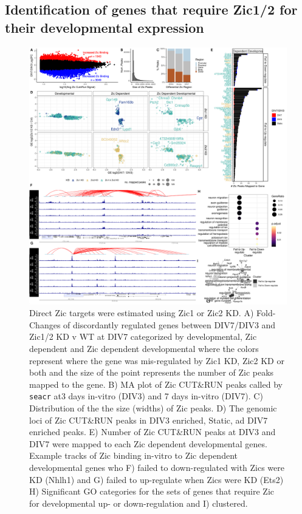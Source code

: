 \documentclass[fleqn,10pt]{wlscirep}
\begin{document}
\subsection*{Identification of genes that require Zic1/2 for their developmental expression}
\begin{figure}[!ht]
\includegraphics[width=.95\textwidth]{../figures/figure4.png}
\caption{Direct Zic targets were estimated using Zic1 or Zic2 KD. A) Fold-Changes of discordantly regulated genes between DIV7/DIV3 and Zic1/2 KD v WT at DIV7 categorized by developmental, Zic dependent and Zic dependent developmental where the colors represent where the gene was mis-regulated by Zic1 KD, Zic2 KD or both and the size of the point represents the number of Zic peaks mapped to the gene. B) MA plot of Zic CUT\&RUN peaks called by \texttt{seacr} at3 days in-vitro (DIV3) and 7 days in-vitro (DIV7). C) Distribution of the the size (widths) of Zic peaks. D) The genomic loci of Zic CUT\&RUN peaks in DIV3 enriched, Static, ad DIV7 enriched peaks.  E) Number of Zic CUT\&RUN peaks at DIV3 and DIV7 were mapped to each Zic dependent developmental genes. Example tracks of Zic binding in-vitro to Zic dependent developmental genes who F) failed to down-regulated with Zics were KD (Nhlh1) and G) failed to up-regulate when Zics were KD (Ets2) H) Significant GO categories for the sets of genes that require Zic for developmental up- or down-regulation and I) clustered. }
\label{fig:ZicKD}
\end{figure}
\end{document}
